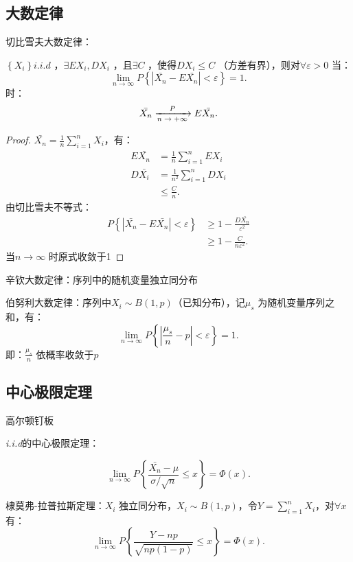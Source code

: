 \subsection{大数定律}%
\label{sub:大数定律}
\begin{notation}
    切比雪夫大数定律：
\end{notation}

\begin{defi}
    $\left\{ X_i \right\} i.i.d$ ，$\exists EX_i,DX_i$ ，且$\exists C$ ，使得$DX_i\le C$ （方差有界），则对$\forall \varepsilon>0$ 当：
    \[
        \lim_{n \to \infty} P\left\{ \left| \bar{X_n}-E\bar{X_n} \right| <\varepsilon \right\} =1
    .\] 
    时：
    \[
        \bar{X_n}\ce{->[$P$][$n\to +\infty $]}E\bar{X_n}
    .\] 
\end{defi}
\begin{proof}
    $\bar{X_n}={\frac{1}{n} \sum_{i=1}^{n} X_i}$，有：
    \begin{align*}
        E\bar{X_n}&=\frac{1}{n} \sum_{i=1}^{n} EX_i\\
        D\bar{X_i}&=\frac{1}{n^2} \sum_{i=1}^{n} DX_i\\
                  &\le \frac{C}{n}
    .\end{align*}
    由切比雪夫不等式：
    \begin{align*}
        P\left\{ \left| \bar{X_n}-E\bar{X_n} \right| <\varepsilon \right\} &\ge 1-\frac{D\bar{X_n}}{\varepsilon^2}\\
                                                                        &\ge 1-\frac{C}{n\varepsilon^2}
    .\end{align*}
    当$n\to \infty $ 时原式收敛于1
\end{proof}
\begin{notation}
    辛钦大数定律：序列中的随机变量独立同分布
\end{notation}
\begin{notation}
    伯努利大数定律：序列中$X_i\sim B\left( 1,p \right) $（已知分布），记$\mu_s$ 为随机变量序列之和，有：
    \[
        \lim_{n \to \infty} P\left\{ \left| \frac{\mu_s}{n} -p  \right| <\varepsilon \right\} =1
    .\] 
    即：${\frac{\mu_s}{n}} $ 依概率收敛于$p$
\end{notation}
\subsection{中心极限定理}%
\label{sub:中心极限定理}
\begin{eg}
    高尔顿钉板
\end{eg}
\begin{cor}
    \textit{i.i.d}的中心极限定理：

    \[
        \lim_{n \to \infty} P\left\{ \frac{\bar{X_n}-\mu}{\sigma /\sqrt{n}  }\le x  \right\} =\Phi\left( x \right) 
    .\] 
\end{cor}
\begin{cor}
    棣莫弗-拉普拉斯定理：$X_i$ 独立同分布，$X_i\sim B\left( 1,p \right) $，令$Y=\sum_{i=1}^{n} X_i$，对$\forall x$ 有：
    \[
        \lim_{n \to \infty} P\left\{ \frac{Y-np}{\sqrt{np\left( 1-p \right) } } \le x \right\} =\Phi\left( x \right) 
    .\]
\end{cor}

